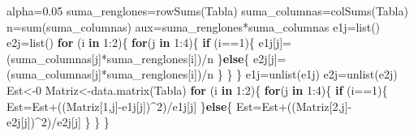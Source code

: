 \documentclass[
]{article}
\newenvironment{Shaded}{\begin{snugshade}}{\end{snugshade}}
\newcommand{\ControlFlowTok}[1]{\textcolor[rgb]{0.13,0.29,0.53}{\textbf{#1}}}
\newcommand{\DecValTok}[1]{\textcolor[rgb]{0.00,0.00,0.81}{#1}}
\newcommand{\FloatTok}[1]{\textcolor[rgb]{0.00,0.00,0.81}{#1}}
\newcommand{\FunctionTok}[1]{\textcolor[rgb]{0.00,0.00,0.00}{#1}}
\newcommand{\NormalTok}[1]{#1}
\newcommand{\OtherTok}[1]{\textcolor[rgb]{0.56,0.35,0.01}{#1}}
\newcommand{\SpecialCharTok}[1]{\textcolor[rgb]{0.00,0.00,0.00}{#1}}
\begin{document}
\begin{Shaded}
\begin{Highlighting}[]
\NormalTok{alpha}\OtherTok{=}\FloatTok{0.05}
\NormalTok{suma\_renglones}\OtherTok{=}\FunctionTok{rowSums}\NormalTok{(Tabla)}
\NormalTok{suma\_columnas}\OtherTok{=}\FunctionTok{colSums}\NormalTok{(Tabla)}
\NormalTok{n}\OtherTok{=}\FunctionTok{sum}\NormalTok{(suma\_columnas)}
\NormalTok{aux}\OtherTok{=}\NormalTok{suma\_renglones}\SpecialCharTok{*}\NormalTok{suma\_columnas}
\NormalTok{e1j}\OtherTok{=}\FunctionTok{list}\NormalTok{()}
\NormalTok{e2j}\OtherTok{=}\FunctionTok{list}\NormalTok{()}
\ControlFlowTok{for}\NormalTok{ (i }\ControlFlowTok{in} \DecValTok{1}\SpecialCharTok{:}\DecValTok{2}\NormalTok{)\{}
  \ControlFlowTok{for}\NormalTok{(j }\ControlFlowTok{in} \DecValTok{1}\SpecialCharTok{:}\DecValTok{4}\NormalTok{)\{}
    \ControlFlowTok{if}\NormalTok{ (i}\SpecialCharTok{==}\DecValTok{1}\NormalTok{)\{}
\NormalTok{      e1j[j]}\OtherTok{=}\NormalTok{(suma\_columnas[j]}\SpecialCharTok{*}\NormalTok{suma\_renglones[i])}\SpecialCharTok{/}\NormalTok{n}
\NormalTok{    \}}\ControlFlowTok{else}\NormalTok{\{}
\NormalTok{      e2j[j]}\OtherTok{=}\NormalTok{(suma\_columnas[j]}\SpecialCharTok{*}\NormalTok{suma\_renglones[i])}\SpecialCharTok{/}\NormalTok{n}
\NormalTok{    \}}
\NormalTok{  \}}
\NormalTok{\}}
\NormalTok{e1j}\OtherTok{=}\FunctionTok{unlist}\NormalTok{(e1j)}
\NormalTok{e2j}\OtherTok{=}\FunctionTok{unlist}\NormalTok{(e2j)}
\NormalTok{Est}\OtherTok{\textless{}{-}}\DecValTok{0}
\NormalTok{Matriz}\OtherTok{\textless{}{-}}\FunctionTok{data.matrix}\NormalTok{(Tabla)}
\ControlFlowTok{for}\NormalTok{ (i }\ControlFlowTok{in} \DecValTok{1}\SpecialCharTok{:}\DecValTok{2}\NormalTok{)\{}
  \ControlFlowTok{for}\NormalTok{(j }\ControlFlowTok{in} \DecValTok{1}\SpecialCharTok{:}\DecValTok{4}\NormalTok{)\{}
    \ControlFlowTok{if}\NormalTok{ (i}\SpecialCharTok{==}\DecValTok{1}\NormalTok{)\{}
\NormalTok{      Est}\OtherTok{=}\NormalTok{Est}\SpecialCharTok{+}\NormalTok{((Matriz[}\DecValTok{1}\NormalTok{,j]}\SpecialCharTok{{-}}\NormalTok{e1j[j])}\SpecialCharTok{\^{}}\DecValTok{2}\NormalTok{)}\SpecialCharTok{/}\NormalTok{e1j[j]}
\NormalTok{    \}}\ControlFlowTok{else}\NormalTok{\{}
\NormalTok{      Est}\OtherTok{=}\NormalTok{Est}\SpecialCharTok{+}\NormalTok{((Matriz[}\DecValTok{2}\NormalTok{,j]}\SpecialCharTok{{-}}\NormalTok{e2j[j])}\SpecialCharTok{\^{}}\DecValTok{2}\NormalTok{)}\SpecialCharTok{/}\NormalTok{e2j[j]}
\NormalTok{    \}}
\NormalTok{  \}}
\NormalTok{\}}
\end{Highlighting}
\end{Shaded}
\end{document}

